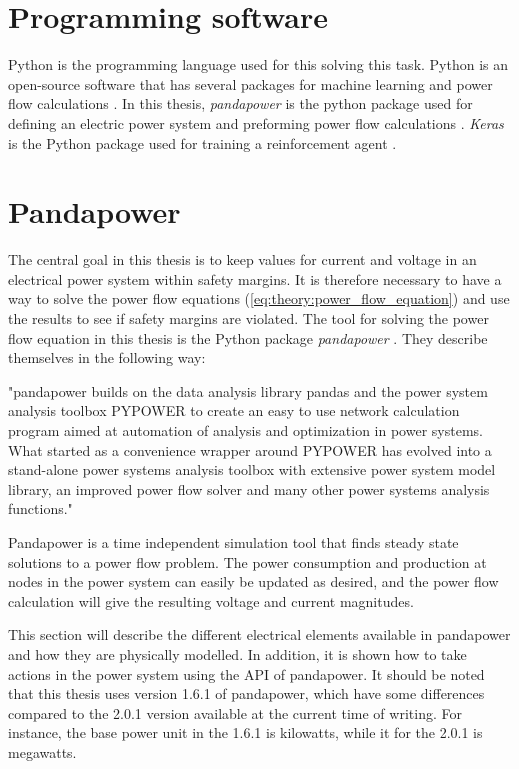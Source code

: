\documentclass[class=book, crop=false]{standalone}
\begin{document}
\section{Programming software}
Python is the programming language used for this solving this task. Python is an open-source software that has several packages for machine learning and power flow calculations \cite{python_web}. In this thesis, \textit{pandapower} is the python package used for defining an electric power system and preforming power flow calculations \cite{pandapower}. \textit{Keras} is the Python package used for training a reinforcement agent \cite{keras_chollet2015}.

\section{Pandapower}
The central goal in this thesis is to keep values for current and voltage in an electrical power system within safety margins. It is therefore necessary to have a way to solve the power flow equations (\eqref{eq:theory:power_flow_equation}) and use the results to see if safety margins are violated. The tool for solving the power flow equation in this thesis is the Python package \textit{pandapower} \cite{pandapower}. They describe themselves in the following way:

\begin{displayquote}
"pandapower builds on the data analysis library pandas and the power system analysis toolbox PYPOWER to create an easy to use network calculation program aimed at automation of analysis and optimization in power systems. What started as a convenience wrapper around PYPOWER has evolved into a stand-alone power systems analysis toolbox with extensive power system model library, an improved power flow solver and many other power systems analysis functions." \cite{pandapower_website}
\end{displayquote}

Pandapower is a time independent simulation tool that finds steady state solutions to a power flow problem. The power consumption and production at nodes in the power system can easily be updated as desired, and the power flow calculation will give the resulting voltage and current magnitudes.

This section will describe the different electrical elements available in pandapower and how they are physically modelled. In addition, it is shown how to take actions in the power system using the API of pandapower. It should be noted that this thesis uses version 1.6.1 of pandapower, which have some differences compared to the 2.0.1 version available at the current time of writing. For instance, the base power unit in the 1.6.1 is kilowatts, while it for the 2.0.1 is megawatts.
\end{document}
